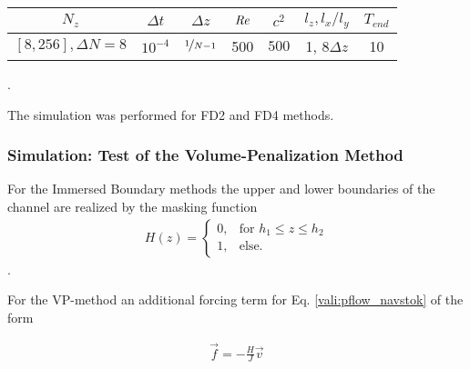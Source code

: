 \begin{center}
\vspace*{0.7ex}
\begin{tabular}{c|c|c|c|c|c|c }
 $ N_z  $                   & $\Delta t$ & $\Delta z$            & $\mbox{\textit{Re}}$  & $c^2$   & $l_z, l_x/l_y$ & $T_{end}$\\
\hline
 $[8, 256], \Delta N = 8 $& $10^{-4}$ & $\nicefrac{1}{N - 1}$ & 500     & $500$   &  1, 8$\Delta z$ &  10\\
\end{tabular}.
\vspace*{0.7ex}
\end{center}

The simulation was performed for FD2 and FD4 methods.

\subsubsection{Simulation: Test of the Volume-Penalization Method}


For the Immersed Boundary methods the upper and lower boundaries of the channel are realized by the masking function
\begin{align}
H(z) = \begin{cases}
                    0, & \text{for \  }  h_1 \leq z \leq h_2 \\
                    1, & \text{else}.
             \end{cases}
\end{align}.

For the VP-method an additional forcing term for Eq. \ref{vali:pflow_navstok} of the form

\begin{align}
    \vec{f} = -\frac{H}{J}\vec{v}
\end{align}

